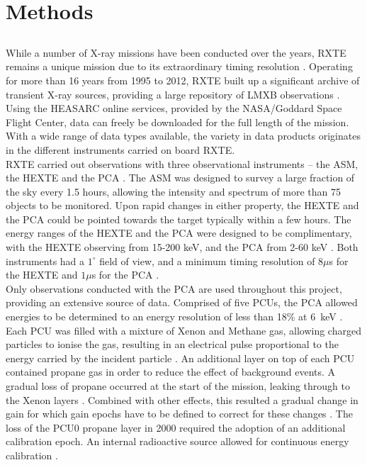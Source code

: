\chapter{Methods}
\label{sec:methods}

\section{}
While a number of X-ray missions have been conducted over the years, \ac{RXTE} remains a unique mission due to its extraordinary timing resolution \citep{bradt1993x}. Operating for more than 16 years from 1995 to 2012, \ac{RXTE} built up a significant archive of transient X-ray sources, providing a large repository of \ac{LMXB} observations \citep{heasarc}. Using the \ac{HEASARC} online services, provided by the NASA/Goddard Space Flight Center, data can freely be downloaded for the full length of the mission. With a wide range of data types available, the variety in data products originates in the different instruments carried on board \ac{RXTE}.\\

\ac{RXTE} carried out observations with three observational instruments -- the \ac{ASM}, the \ac{HEXTE} and the \ac{PCA} \citep{bradt1993x}. The \ac{ASM} was designed to survey a large fraction of the sky every 1.5 hours, allowing the intensity and spectrum of more than 75 objects to be monitored. Upon rapid changes in either property, the \ac{HEXTE} and the \ac{PCA} could be pointed towards the target typically within a few hours. The energy ranges of the \ac{HEXTE} and the \ac{PCA} were designed to be complimentary, with the \ac{HEXTE} observing from 15-200 keV, and the \ac{PCA} from 2-60 keV \citep{jahoda1996orbit}. Both instruments had a $1^\circ$ field of view, and a minimum timing resolution of $8\mu$s for the \ac{HEXTE} and $1\mu$s for the \ac{PCA} \citep{rothschild1998flight, zhang1993laboratory}. \\

Only observations conducted with the \ac{PCA} are used throughout this project, providing an extensive source of data. Comprised of five \acp{PCU}, the \ac{PCA} allowed energies to be determined to an energy resolution of less than 18\% at 6~keV \citep{pcainfo}. Each \ac{PCU} was filled with a mixture of Xenon and Methane gas, allowing charged particles to ionise the gas, resulting in an electrical pulse proportional to the energy carried by the incident particle \citep{zhang1993laboratory}. An additional layer on top of each \ac{PCU} contained propane gas in order to reduce the effect of background events. A gradual loss of propane occurred at the start of the mission, leaking through to the Xenon layers \citep{jahoda1996orbit}. Combined with other effects, this resulted a gradual change in gain for which gain epochs have to be defined to correct for these changes \citep{rxteenergychannel}. The loss of the PCU$0$ propane layer in 2000 required the adoption of an additional calibration epoch. An internal radioactive source allowed for continuous energy calibration \citep{zhang1993laboratory}.\\

